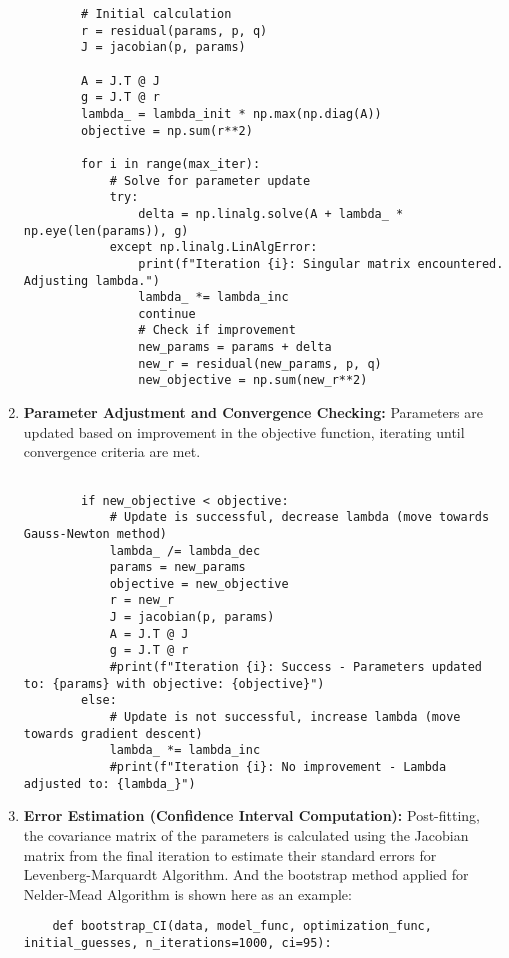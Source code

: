 \documentclass[12pt]{article} %
\begin{document}
\begin{enumerate}
\begin{lstlisting}
        # Initial calculation
        r = residual(params, p, q)
        J = jacobian(p, params)
        
        A = J.T @ J
        g = J.T @ r
        lambda_ = lambda_init * np.max(np.diag(A))
        objective = np.sum(r**2)
    
        for i in range(max_iter):
            # Solve for parameter update
            try:
                delta = np.linalg.solve(A + lambda_ * np.eye(len(params)), g)
            except np.linalg.LinAlgError:
                print(f"Iteration {i}: Singular matrix encountered. Adjusting lambda.")
                lambda_ *= lambda_inc
                continue
                # Check if improvement
                new_params = params + delta
                new_r = residual(new_params, p, q)
                new_objective = np.sum(new_r**2)
            \end{lstlisting}

    \item \textbf{Parameter Adjustment and Convergence Checking:}
    Parameters are updated based on improvement in the objective function, iterating until convergence criteria are met.
    \begin{lstlisting}
        
        if new_objective < objective:
            # Update is successful, decrease lambda (move towards Gauss-Newton method)
            lambda_ /= lambda_dec
            params = new_params
            objective = new_objective
            r = new_r
            J = jacobian(p, params)
            A = J.T @ J
            g = J.T @ r
            #print(f"Iteration {i}: Success - Parameters updated to: {params} with objective: {objective}")
        else:
            # Update is not successful, increase lambda (move towards gradient descent)
            lambda_ *= lambda_inc
            #print(f"Iteration {i}: No improvement - Lambda adjusted to: {lambda_}")
    \end{lstlisting}
    \item \textbf{Error Estimation (Confidence Interval Computation):}
    Post-fitting, the covariance matrix of the parameters is calculated using the Jacobian matrix from the final iteration to estimate their standard errors for Levenberg-Marquardt Algorithm.
    And the bootstrap method applied for Nelder-Mead Algorithm is shown here as an example:
    \begin{lstlisting}
    def bootstrap_CI(data, model_func, optimization_func, initial_guesses, n_iterations=1000, ci=95):


\end{lstlisting}
\end{enumerate}
\end{document}
